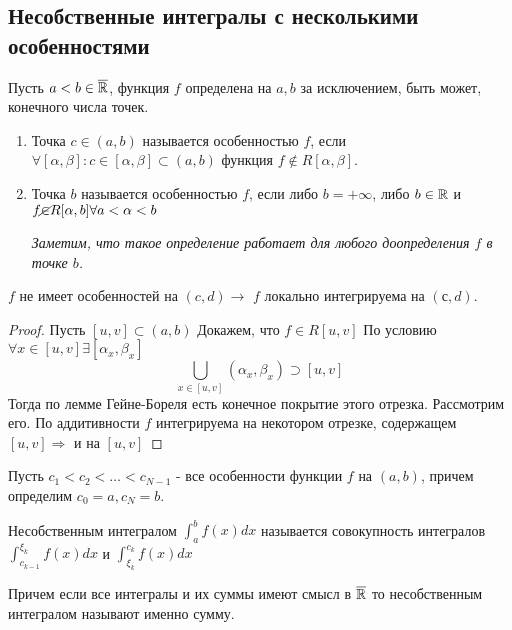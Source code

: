 \subsection{Несобственные интегралы с несколькими особенностями}
\begin{definition}
    Пусть \(a < b \in \overline{\mathbb{R}}\), функция \(f\) определена на \(a, b\) за исключением, быть может, конечного числа точек. 
    \begin{enumerate}
        \item Точка \(c \in (a, b)\) называется особенностью \(f\), если \(\forall [\alpha, \beta]: c \in [\alpha, \beta] \subset (a, b)\) функция \(f \notin R[\alpha, \beta]\). 
        
        \item Точка \(b\) называется особенностью \(f\), если либо $b = +\infty$, либо $b \in \mathbb{R}$ и $f \cancel{\in} R[\alpha, b] \forall a < \alpha < b$

        \textit{Заметим, что такое определение работает для любого доопределения $f$ в точке $b$.}
    \end{enumerate}
\end{definition}
    \begin{note}
        $f$ не имеет особенностей на $(c, d) \rightarrow$ $f$ локально интегрируема на $(с, d)$.
    \end{note}
    \begin{proof}
        Пусть $[u,v] \subset (a,b)$
        Докажем, что $f \in R [u,v]$
        По условию $\forall x \in [u,v] \exists [\alpha_x,\beta_x]$
        $$\bigcup_{x \in [u, v]}(\alpha_x, \beta_x) \supset [u, v]$$
        Тогда по лемме Гейне-Бореля есть конечное покрытие этого отрезка. 
        Рассмотрим его.
        По аддитивности $f$ интегрируема на некотором отрезке, содержащем $[u, v] \Rightarrow$ и на $[u, v]$
    \end{proof}
    \begin{definition}
        Пусть $c_1 < c_2 < \dots < c_{N-1} $ - все особенности функции $f$ на $(a, b)$, причем определим \(c_0 = a, c_N = b\).

    \end{definition}

    Несобственным интегралом $\int_{a}^b f(x) dx$ называется совокупность интегралов $\int_{c_{k-1}}^{\xi_k}f(x)dx$ и $\int_{\xi_k}^{c_k} f(x)dx$

    Причем если все интегралы и их суммы имеют смысл в $\overline{\mathbb{R}}$ то несобственным интегралом называют именно сумму.
        
    
        
